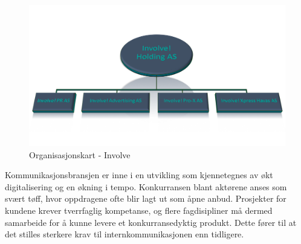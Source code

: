 \begin{figure}[H]
\centering
\includegraphics [scale=0.45]{bilder/org.png}
\caption{Organisasjonskart - Involve}
\label{fig:org}
\end{figure}

Kommunikasjonsbransjen er inne i en utvikling som kjennetegnes av økt digitalisering og en økning i tempo. Konkurransen blant aktørene anses som svært tøff, hvor oppdragene ofte blir lagt ut som åpne anbud. Prosjekter for kundene krever tverrfaglig kompetanse, og flere fagdisipliner må dermed samarbeide for å kunne levere et konkurransedyktig produkt. Dette fører til at det stilles sterkere krav til internkommunikasjonen enn tidligere. 
